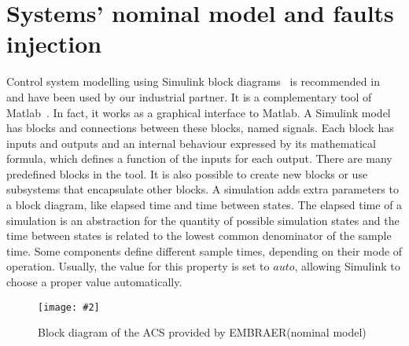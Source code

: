 \documentclass[12pt,openright,twoside,a4paper,oldfontcommands,english,brazil,draft]{abntex2}
\theoremstyle{theo}
\newcommand{\includegraphicsaspectratio}[2][1]{%
  \texttt{[image: \#2]}%
}
\newcommand{\EMBRAER}{EMBRAER\xspace}
\newcommand{\matlab}{\textsf{Matlab}\xspace}
\newcommand{\textsim}[1]{$#1$}
\newcommand{\simulink}{Simulink\xspace}
\newcommand{\parsin}[1]{\ensuremath\left( #1 \right)}
\begin{document}


\section{Systems' nominal model and faults injection}
\label{sec:faults-injection}

Control system modelling using \simulink block diagrams~\cite{MathWorks2010} is recommended in~\cite{Nise1992} and have been used by our industrial partner.
It is a complementary tool of \matlab~\cite{MathWorks2010c}.
In fact, it works as a graphical interface to \matlab.
A \simulink model has blocks and connections between these blocks, named signals.
Each block has inputs and outputs and an internal behaviour expressed by its mathematical formula, which defines a function of the inputs for each output.
There are many predefined blocks in the tool.
It is also possible to create new blocks or use subsystems that encapsulate other blocks.
A simulation adds extra parameters to a block diagram, like elapsed time and time between states.
The elapsed time of a simulation is an abstraction for the quantity of possible simulation states and the time between states is related to the lowest common denominator of the sample time.
Some components define different sample times, depending on their mode of operation.
Usually, the value for this property is set to \textsim{auto}, allowing \simulink to choose a proper value automatically.

\begin{figure}[t] \centering
  \includegraphicsaspectratio{acsBlockDiagrams}
  \caption{Block diagram of the ACS provided by \EMBRAER (nominal model)}
  \label{fg:acsBlockDiagrams}
\end{figure}
\end{document}
